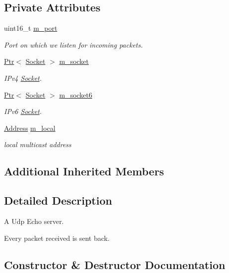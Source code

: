 \subsection*{Private Attributes}
\begin{DoxyCompactItemize}
\item 
uint16\+\_\+t \hyperlink{classns3_1_1UdpEchoServer_a032318eadecb7de407f10f1960cadb7b}{m\+\_\+port}
\begin{DoxyCompactList}\small\item\em Port on which we listen for incoming packets. \end{DoxyCompactList}\item 
\hyperlink{classns3_1_1Ptr}{Ptr}$<$ \hyperlink{classns3_1_1Socket}{Socket} $>$ \hyperlink{classns3_1_1UdpEchoServer_ab7aa28adb2e7743fb2b3c12d4f6da8bd}{m\+\_\+socket}
\begin{DoxyCompactList}\small\item\em I\+Pv4 \hyperlink{classns3_1_1Socket}{Socket}. \end{DoxyCompactList}\item 
\hyperlink{classns3_1_1Ptr}{Ptr}$<$ \hyperlink{classns3_1_1Socket}{Socket} $>$ \hyperlink{classns3_1_1UdpEchoServer_a6e0a6cf77c620920c00a0b6e5cc8d712}{m\+\_\+socket6}
\begin{DoxyCompactList}\small\item\em I\+Pv6 \hyperlink{classns3_1_1Socket}{Socket}. \end{DoxyCompactList}\item 
\hyperlink{classns3_1_1Address}{Address} \hyperlink{classns3_1_1UdpEchoServer_a231b982647342912704bbcf444b01806}{m\+\_\+local}
\begin{DoxyCompactList}\small\item\em local multicast address \end{DoxyCompactList}\end{DoxyCompactItemize}
\subsection*{Additional Inherited Members}


\subsection{Detailed Description}
A Udp Echo server. 

Every packet received is sent back. 

\subsection{Constructor \& Destructor Documentation}
